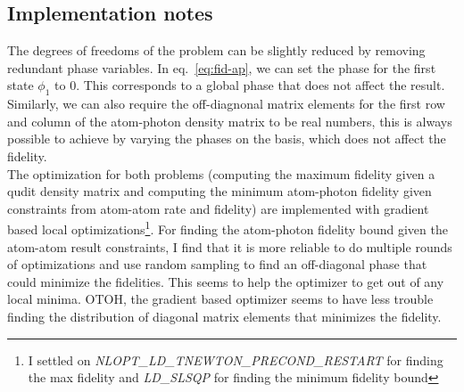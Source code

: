 \documentclass[10pt,fleqn]{article}
\begin{document}
\subsection{Implementation notes}
The degrees of freedoms of the problem can be slightly reduced by removing redundant phase variables.
In eq.~\ref{eq:fid-ap}, we can set the phase for the first state $\phi_1$ to $0$.
This corresponds to a global phase that does not affect the result.
Similarly, we can also require the off-diagnonal matrix elements for the first row and column of the atom-photon density matrix to be real numbers, this is always possible to achieve by varying the phases on the basis, which does not affect the fidelity.\\

The optimization for both problems (computing the maximum fidelity given a qudit density matrix and computing the minimum atom-photon fidelity given constraints from atom-atom rate and fidelity) are implemented with gradient based local optimizations\footnote{I settled on \textit{NLOPT\_LD\_TNEWTON\_PRECOND\_RESTART} for finding the max fidelity and \textit{LD\_SLSQP} for finding the minimum fidelity bound}. For finding the atom-photon fidelity bound given the atom-atom result constraints, I find that it is more reliable to do multiple rounds of optimizations and use random sampling to find an off-diagonal phase that could minimize the fidelities. This seems to help the optimizer to get out of any local minima. OTOH, the gradient based optimizer seems to have less trouble finding the distribution of diagonal matrix elements that minimizes the fidelity.
\end{document}
